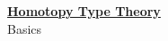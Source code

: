 \documentclass[hott-all.tex]{subfiles}
\begin{document}
\begin{center}
  {\Large{\underline{\textbf{Homotopy Type Theory}}}} \\[2mm]
  {\large Basics}
\end{center}
\setcounter{chapter}{2}

%
%
\end{document}
